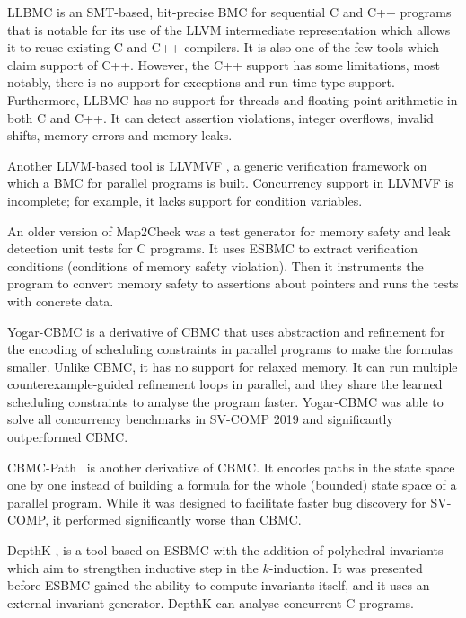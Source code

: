 LLBMC  is an SMT-based, bit-precise BMC for
sequential C and C++ programs that is notable for its use of the LLVM
intermediate representation which allows it to reuse existing C and C++
compilers.
It is also one of the few tools which claim support of C++.
However, the C++ support has some limitations, most notably, there is no
support for exceptions and run-time type support.
Furthermore, LLBMC has no support for threads and floating-point arithmetic in
both C and C++.
It can detect assertion violations, integer overflows, invalid shifts, memory
errors and memory leaks.

Another LLVM-based tool is LLVMVF , a generic verification framework on which a BMC for parallel programs is built.
Concurrency support in LLVMVF is incomplete; for example, it lacks support for condition variables.

An older version of Map2Check  was a test generator for memory safety and leak detection unit tests for C programs.
It uses ESBMC to extract verification conditions (conditions of memory safety violation).
Then it instruments the program to convert memory safety to assertions about pointers and runs the tests with concrete data.

Yogar-CBMC  is a derivative of CBMC that uses
abstraction and refinement for the encoding of scheduling constraints in
parallel programs to make the formulas smaller.
Unlike CBMC, it has no support for relaxed memory.
It can run multiple counterexample-guided refinement loops in parallel, and
they share the learned scheduling constraints to analyse the program faster.
Yogar-CBMC was able to solve all concurrency benchmarks in SV-COMP 2019 and significantly outperformed CBMC.

CBMC-Path~ is another derivative of CBMC.
It encodes paths in
the state space one by one instead of building a formula for the whole
(bounded) state space of a parallel program.
While it was designed to facilitate faster bug discovery for SV-COMP, it performed significantly worse than CBMC.

DepthK , is a tool based on ESBMC with the
addition of polyhedral invariants which aim to strengthen inductive step in the
$k$-induction.
It was presented before ESBMC gained the ability to compute invariants itself, and it uses an external invariant generator.
DepthK can analyse concurrent C programs.

